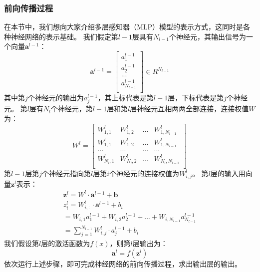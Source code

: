 \documentclass[UTF8]{article}
\begin{document}
\subsubsection{前向传播过程}
在本节中，我们想向大家介绍多层感知器（MLP）模型的表示方式，这同时是各种神经网络的表示基础。\newline
我们假定第$l-1$层具有$N_{l-1}$个神经元，其输出信号为一个向量$\boldsymbol{a}^{l-1}$：
\begin{equation}
\boldsymbol{a}^{l-1}= \begin{bmatrix}
a_{1}^{l-1} \\
a_{2}^{l-1} \\
... \\
a_{N_{l-1}}^{l-1} \\
\end{bmatrix} \in R^{N_{l-1}}
\label{mlp-a-l-1}
\end{equation}
其中第$j$个神经元的输出为$a_{j}^{l-1}$，其上标代表是第$l-1$层，下标代表是第$j$个神经元。
第$l$层有$N_{l}$个神经元，第$l-1$层和第$l$层神经元互相两两全部连接，连接权值$W$为：
\begin{equation}
W^{l}=\begin{bmatrix}
W_{1,1}^{l} & W_{1,2}^{l} & ... & W_{1,N_{l-1}}^{l} \\
W_{1,1}^{l} & W_{1,2}^{l} & ... & W_{1,N_{l-1}}^{l} \\
... & ... & ... & ... \\
W_{N_{l},1}^{l} & W_{N_{l},2}^{l} & ... & W_{N_{l},N_{l-1}}^{l} \\
\end{bmatrix}
\label{mlp-w-l-1-l}
\end{equation}
第$l-1$层第$j$个神经元指向第$l$层第$i$个神经元的连接权值为$W_{i,j}^{l}$。\newline
第$l$层的输入用向量$\boldsymbol{z}^{l}$表示：
\begin{equation}
\begin{aligned}
\boldsymbol{z}^{l} = W^{l} \cdot \boldsymbol{a}^{l-1} + \boldsymbol{b} \\
z_{i}^{l} = W_{i,:}^{l} \cdot \boldsymbol{a}^{l-1} + b_{i} \\
= W_{i,1} a_{1}^{l-1} + W_{i,2} a_{2}^{l-1} + ... + W_{i,N_{l-1}} a_{N_{l-1}}^{l-1} \\
= \sum_{j=1}^{N_{l-1}} W_{i,j}^{l} \cdot a_{j}^{l-1} + b_{i}
\end{aligned}
\label{mlp-z-l-def}
\end{equation}
我们假设第$l$层的激活函数为$f(x)$，则第$l$层输出为：
\begin{equation}
\boldsymbol{a}^{l}= f(\boldsymbol{z}^{l})
\label{mlp-a-l-def}
\end{equation}
依次运行上述步骤，即可完成神经网络的前向传播过程，求出输出层的输出。
\end{document}
